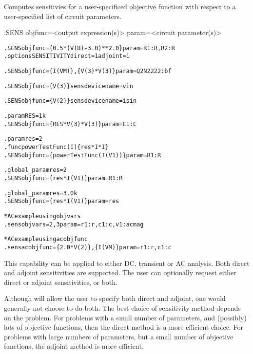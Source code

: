 


 
Computes sensitivies for a user-specificed objective function
with respect to a user-specified list of circuit parameters.  


\begin{Command}

\format
.SENS objfunc=<output expression(s)> param=<circuit parameter(s)>  

\examples
\begin{alltt}
.SENS objfunc=\{0.5*(V(B)-3.0)**2.0\} param=R1:R,R2:R
.options SENSITIVITY direct=1 adjoint=1

.SENS objfunc=\{I(VM)\},\{V(3)*V(3)\} param= Q2N2222:bf

.SENS objfunc=\{V(3)\} sensdevicename=vin

.SENS objfunc=\{V(2)\} sensdevicename=isin

.param RES=1k
.SENS objfunc=\{RES*V(3)*V(3)\} param=C1:C

.param res=2
.func powerTestFunc(I) \{res*I*I\}
.SENS objfunc=\{powerTestFunc(I(V1))\} param=R1:R

.global\_param res=2
.SENS objfunc=\{res*I(V1)\} param=R1:R

.global\_param res=3.0k
.SENS objfunc=\{res*I(V1)\} param=res

* AC example using objvars
.sens objvars=2,3 param=r1:r,c1:c,v1:acmag

* AC example using acobjfunc
.sens acobjfunc=\{2.0*V(2)\},\{I(VM)\} param=r1:r,c1:c
\end{alltt}

\comments

This capability can be applied to either DC, transient or AC analysis.  
Both direct and adjoint sensitivities are supported. 
The user can optionally request either direct or adjoint sensitivities, 
or both.  

Although \Xyce{} will allow the user to specify both direct and 
adjoint, one would generally not choose to do both.
The best choice of sensitivity method depends on the problem.  For problems 
with a small number of parameters, and (possibly) lots of objective functions, 
then the direct method is a more efficient choice.  For problems with large 
numbers of parameters, but a small number of objective functions, the 
adjoint method is more efficient.


\end{Command}

